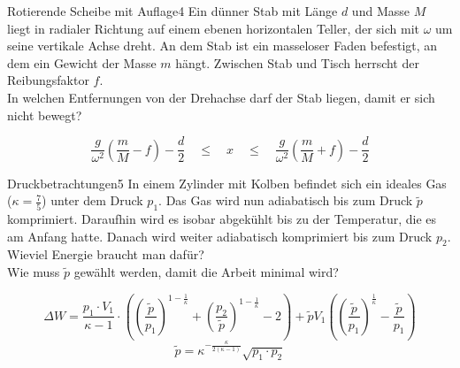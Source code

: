 \begin{problem}{Rotierende Scheibe mit Auflage}{4}
Ein dünner Stab mit Länge $d$ und Masse $M$ liegt in radialer Richtung auf einem ebenen horizontalen Teller, der sich mit $\omega$ um seine vertikale Achse dreht. An dem Stab ist ein masseloser Faden befestigt, an dem ein Gewicht der Masse $m$ hängt. Zwischen Stab und Tisch herrscht der Reibungsfaktor $f$.\\
In welchen Entfernungen von der Drehachse darf der Stab liegen, damit er sich nicht bewegt?
\begin{solution}
\[
\frac{g}{\omega^2}\left(\frac{m}{M}-f\right)-\frac{d}{2}\quad\leq\quad x
\quad\leq\quad\frac{g}{\omega^2}\left(\frac{m}{M}+f\right)-\frac{d}{2}
\]
\end{solution}
\end{problem}


\begin{problem}{Druckbetrachtungen}{5}
In einem Zylinder mit Kolben befindet sich ein ideales Gas ($\kappa=\frac{7}{5}$) unter dem Druck $p_1$. Das Gas wird nun adiabatisch bis zum Druck $\tilde{p}$ komprimiert. Daraufhin wird es isobar abgekühlt bis zu der Temperatur, die es am Anfang hatte. Danach wird weiter adiabatisch komprimiert bis zum Druck $p_2$.\\
Wieviel Energie braucht man dafür?\\
Wie muss $\tilde{p}$ gewählt werden, damit die Arbeit minimal wird?
\begin{solution}
\[
\Delta W =\frac{p_1\cdot V_1}{\kappa-1}\cdot\left(\left(\frac{\tilde{p}}{p_1}\right)^{1-\frac{1}{\kappa}} +\left(\frac{p_2}{\tilde{p}}\right)^{1-\frac{1}{\kappa}}-2\right)
+ \tilde p V_1 \left( \left(\frac{\tilde{p}}{p_1}\right)^{\frac{1}{\kappa}} - \frac{\tilde{p}}{p_1} \right)
\]
\[
\tilde{p} = \kappa^{- \frac{\kappa}{2(\kappa-1)}} \sqrt{p_1\cdot p_2}
\]
\end{solution}
\end{problem}

